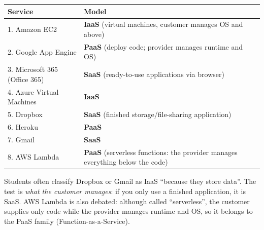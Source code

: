 \documentclass[11pt]{article}
\begin{document}
\begin{corrige}
\begin{center}
\begin{tabularx}{\linewidth}{|l|X|}\hline
\rowcolor{popblueL} \textbf{Service} & \textbf{Model} \\ \hline
1. Amazon EC2 & \textbf{IaaS} (virtual machines, customer manages OS and above) \\ \hline
2. Google App Engine & \textbf{PaaS} (deploy code; provider manages runtime and OS) \\ \hline
3. Microsoft 365 (Office 365) & \textbf{SaaS} (ready-to-use applications via browser) \\ \hline
4. Azure Virtual Machines & \textbf{IaaS} \\ \hline
5. Dropbox & \textbf{SaaS} (finished storage/file-sharing application) \\ \hline
6. Heroku & \textbf{PaaS} \\ \hline
7. Gmail & \textbf{SaaS} \\ \hline
8. AWS Lambda & \textbf{PaaS} (serverless functions: the provider manages everything below the code) \\ \hline
\end{tabularx}
\end{center}

\begin{attention}
Students often classify Dropbox or Gmail as IaaS ``because they store data''. The test is \emph{what the customer manages}: if you only use a finished application, it is SaaS. AWS Lambda is also debated: although called ``serverless'', the customer supplies only code while the provider manages runtime and OS, so it belongs to the PaaS family (Function-as-a-Service).
\end{attention}
\end{corrige}
\end{document}
